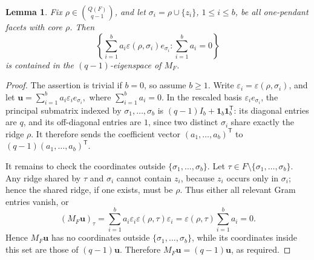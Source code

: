 \documentclass[11pt]{article}
\newtheorem{lemma}[theorem]{Lemma}
\begin{document}
\begin{lemma}\label{lem:leaf-differences}
Fix \(\rho\in\binom{Q(F)}{q-1}\), and let
\(\sigma_i=\rho\cup\{z_i\}\), \(1\leq i\leq b\), be all one-pendant
facets with core \(\rho\). Then
\[
\left\{
\sum_{i=1}^b
a_i\varepsilon(\rho,\sigma_i)e_{\sigma_i}:
\sum_{i=1}^b a_i=0
\right\}
\]
is contained in the \((q-1)\)-eigenspace of \(M_F\).
\end{lemma}

\begin{proof}
The assertion is trivial if \(b=0\), so assume \(b\geq1\). Write
\(\varepsilon_i=\varepsilon(\rho,\sigma_i)\), and let
$\mathbf u=\sum_{i=1}^b a_i\varepsilon_i e_{\sigma_i},$
where $\sum_{i=1}^b a_i=0.$
In the rescaled basis \(\varepsilon_i e_{\sigma_i}\), the principal
submatrix indexed by \(\sigma_1,\ldots,\sigma_b\) is
\((q-1)I_b+\mathbf 1_b\mathbf 1_b^{\mathsf T}\): its diagonal entries
are \(q\), and its off-diagonal entries are \(1\), since two distinct
\(\sigma_i\) share exactly the ridge \(\rho\). It therefore sends the
coefficient vector \((a_1,\ldots,a_b)^{\mathsf T}\) to
\((q-1)(a_1,\ldots,a_b)^{\mathsf T}\).

It remains to check the coordinates outside
\(\{\sigma_1,\ldots,\sigma_b\}\). Let
\(\tau\in F\setminus\{\sigma_1,\ldots,\sigma_b\}\). Any ridge shared by
\(\tau\) and \(\sigma_i\) cannot contain \(z_i\), because \(z_i\) occurs
only in \(\sigma_i\); hence the shared ridge, if one exists, must be
\(\rho\). Thus either all relevant Gram entries vanish, or
\[
(M_F\mathbf u)_\tau
=
\sum_{i=1}^b
a_i\varepsilon_i
\varepsilon(\rho,\tau)\varepsilon_i
=
\varepsilon(\rho,\tau)\sum_{i=1}^b a_i
=0.
\]
Hence \(M_F\mathbf u\) has no coordinates outside
\(\{\sigma_1,\ldots,\sigma_b\}\), while its coordinates inside this set
are those of \((q-1)\mathbf u\). Therefore
\(M_F\mathbf u=(q-1)\mathbf u\), as required.
\end{proof}
	
\end{document}

